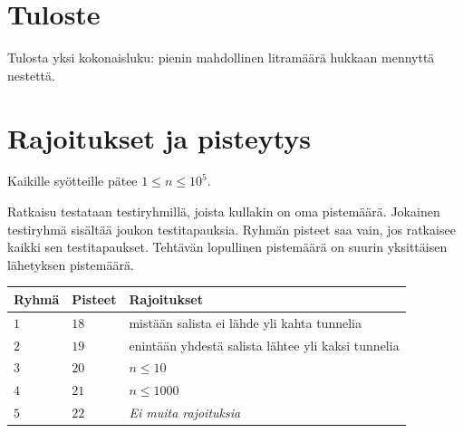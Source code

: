 \section*{Tuloste}

Tulosta yksi kokonaisluku: pienin mahdollinen litramäärä hukkaan mennyttä nestettä.

\section*{Rajoitukset ja pisteytys}

Kaikille syötteille pätee
$1\leq n\leq 10^5$. %

Ratkaisu testataan testiryhmillä, joista kullakin on oma pistemäärä.
Jokainen testiryhmä sisältää joukon testitapauksia.
Ryhmän pisteet saa vain, jos ratkaisee kaikki sen testitapaukset.
Tehtävän lopullinen pistemäärä on suurin yksittäisen lähetyksen pistemäärä.

\medskip
\begin{tabular}{lll}
Ryhmä & Pisteet & Rajoitukset \\\hline
  $1$ & $18$ & mistään salista ei lähde yli kahta tunnelia \\
  $2$ & $19$ & enintään yhdestä salista lähtee yli kaksi tunnelia \\
  $3$ & $20$ & $n\leq 10$\\
  $4$ & $21$ & $n\leq 1000$\\
  $5$ & $22$ & \emph{Ei muita rajoituksia}
\end{tabular}
